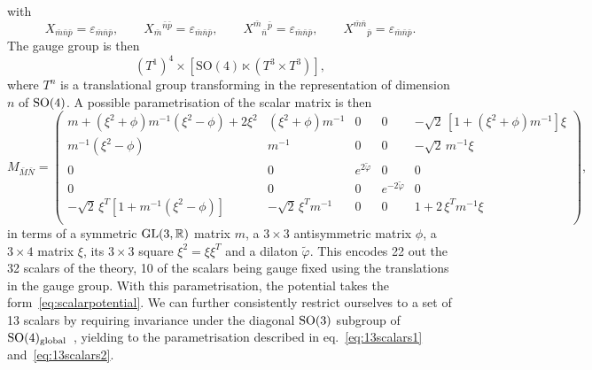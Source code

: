 \documentclass[11pt,a4paper]{article}
\newcommand{\bM}{{\bar{M}}}
\newcommand{\bN}{{\bar{N}}}
\begin{document}
with 
%
\begin{equation}
	X_{\bar m\bar n \bar p} = \varepsilon_{\bar m \bar n \bar p},		\qquad
	X_{\bar m}{}^{\bar n \bar p} = \varepsilon_{\bar m \bar n \bar p},	\qquad
	X^{\bar m}{}_{\bar n}{}^{\bar p} = \varepsilon_{\bar m \bar n \bar p},	\qquad
	X^{\bar m\bar n}{}_{\bar p} = \varepsilon_{\bar m \bar n \bar p}.
\end{equation}
The gauge group is then
\begin{equation}
	(T^1)^4\times[\text{SO}(4)\ltimes(T^3\times T^3)],
\end{equation}
where $T^{n}$ is a translational group transforming in the representation of dimension $n$ of ${\rm SO}(4)$. A possible parametrisation of the scalar matrix is then
\begin{equation}	\label{eq: scalarmatrix}
	M_{\bM\bN}
	=
	\begin{pmatrix}
		m+(\xi^2+\phi)m^{-1}(\xi^2-\phi)+2\xi^2	& 	(\xi^2+\phi)m^{-1}		&	0	&  0  &	-\sqrt2\,[1+(\xi^2+\phi)m^{-1}]\xi	\\
		m^{-1}(\xi^2-\phi)	& 	m^{-1}	&	0  	&  0  &	-\sqrt2\,m^{-1}\xi	\\
		0		&	0		&	e^{2\tilde\varphi}	&	0				&	0		\\
		0		&	0		&	0				&	e^{-2\tilde\varphi}	&	0		\\
		-\sqrt2\,\xi^T[1+m^{-1}(\xi^2-\phi)]	&	-\sqrt2\,\xi^Tm^{-1}	&	0	&	0	&	1+2\,\xi^Tm^{-1}\xi	\\
	\end{pmatrix},
\end{equation}
in terms of a symmetric ${\rm GL}(3,\mathbb{R})$ matrix $m$, a $3\times3$ antisymmetric matrix $\phi$, a $3\times4$ matrix $\xi$, its $3\times 3$ square $\xi^{2} = \xi \xi^{T}$ and a dilaton $\tilde{\varphi}$. This encodes 22 out the 32 scalars of the theory, 10 of the scalars being gauge fixed using the translations in the gauge group. With this parametrisation, the potential takes the form~\eqref{eq:scalarpotential}. We can further consistently restrict ourselves to a set of 13 scalars by requiring invariance under the diagonal ${\rm SO}(3)$ subgroup of ${\rm SO}(4)_{\rm global}$~\cite{Eloy:2021fhc}, yielding to the parametrisation described in eq.~\eqref{eq:13scalars1} and~\eqref{eq:13scalars2}.
\end{document}
